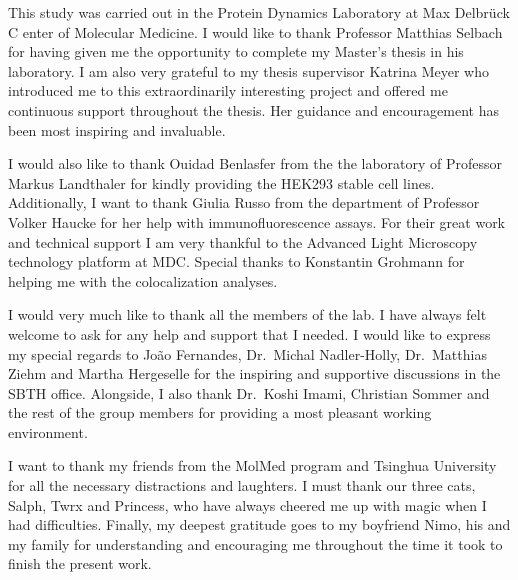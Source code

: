 \documentclass[
12pt, %
english, %
onehalfspacing, %
headsepline, %
]{MastersDoctoralThesis} %
\begin{document}
\begin{acknowledgements}
\addchaptertocentry{\acknowledgementname} %
This study was carried out in the Protein Dynamics Laboratory at Max Delbr\"{u}ck C	enter of Molecular Medicine. I would like to thank Professor Matthias Selbach for having given me the opportunity to complete my Master's thesis in his laboratory. I am also very grateful to my thesis supervisor Katrina Meyer who introduced me to this extraordinarily interesting project and offered me continuous support throughout the thesis. Her guidance and encouragement has been most inspiring and invaluable.

I would also like to thank Ouidad Benlasfer from the the laboratory of Professor Markus Landthaler for kindly providing the HEK293 stable cell lines. Additionally, I want to thank Giulia Russo from the department of Professor Volker Haucke for her help with immunofluorescence assays. For their great work and technical support I am very thankful to the Advanced Light Microscopy technology platform at MDC. Special thanks to Konstantin Grohmann for helping me with the colocalization analyses.

I would very much like to thank all the members of the lab. I have always felt welcome to ask for any help and support that I needed. I would like to express my special regards to Jo\~{a}o Fernandes, Dr.\ Michal Nadler-Holly, Dr.\ Matthias Ziehm and Martha Hergeselle for the inspiring and supportive discussions in the SBTH office. Alongside, I also thank Dr.\ Koshi Imami, Christian Sommer and the rest of the group members for providing a most pleasant working environment.

I want to thank my friends from the MolMed program and Tsinghua University for all the necessary distractions and laughters. I must thank our three cats, Salph, Twrx and Princess, who have always cheered me up with magic when I had difficulties. Finally, my deepest gratitude goes to my boyfriend Nimo, his and my family for understanding and encouraging me throughout the time it took to finish the present work.

\end{acknowledgements}


\end{document}
